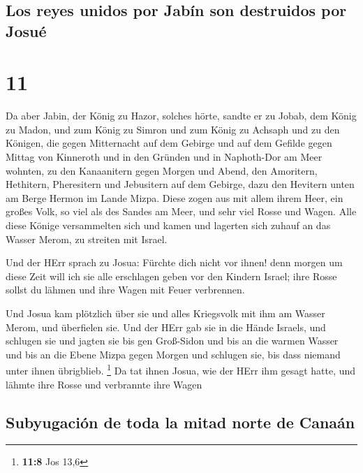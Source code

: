 \hypertarget{los-reyes-unidos-por-jabuxedn-son-destruidos-por-josuuxe9}{%
\subsection{Los reyes unidos por Jabín son destruidos por
Josué}\label{los-reyes-unidos-por-jabuxedn-son-destruidos-por-josuuxe9}}

\hypertarget{section-10}{%
\section{11}\label{section-10}}

 Da aber Jabin, der König zu Hazor, solches hörte, sandte
er zu Jobab, dem König zu Madon, und zum König zu Simron und zum König
zu Achsaph  und zu den Königen, die gegen Mitternacht auf
dem Gebirge und auf dem Gefilde gegen Mittag von Kinneroth und in den
Gründen und in Naphoth-Dor am Meer wohnten,  zu den
Kanaanitern gegen Morgen und Abend, den Amoritern, Hethitern,
Pheresitern und Jebusitern auf dem Gebirge, dazu den Hevitern unten am
Berge Hermon im Lande Mizpa.  Diese zogen aus mit allem
ihrem Heer, ein großes Volk, so viel als des Sandes am Meer, und sehr
viel Rosse und Wagen.  Alle diese Könige versammelten sich
und kamen und lagerten sich zuhauf an das Wasser Merom, zu streiten mit
Israel.

 Und der HErr sprach zu Josua: Fürchte dich nicht vor
ihnen! denn morgen um diese Zeit will ich sie alle erschlagen geben vor
den Kindern Israel; ihre Rosse sollst du lähmen und ihre Wagen mit Feuer
verbrennen.

 Und Josua kam plötzlich über sie und alles Kriegsvolk mit
ihm am Wasser Merom, und überfielen sie.  Und der HErr gab
sie in die Hände Israels, und schlugen sie und jagten sie bis gen
Groß-Sidon und bis an die warmen Wasser und bis an die Ebene Mizpa gegen
Morgen und schlugen sie, bis dass niemand unter ihnen übrigblieb.
\footnote{\textbf{11:8} Jos 13,6}  Da tat ihnen Josua, wie
der HErr ihm gesagt hatte, und lähmte ihre Rosse und verbrannte ihre
Wagen

\hypertarget{subyugaciuxf3n-de-toda-la-mitad-norte-de-canauxe1n}{%
\subsection{Subyugación de toda la mitad norte de
Canaán}\label{subyugaciuxf3n-de-toda-la-mitad-norte-de-canauxe1n}}

